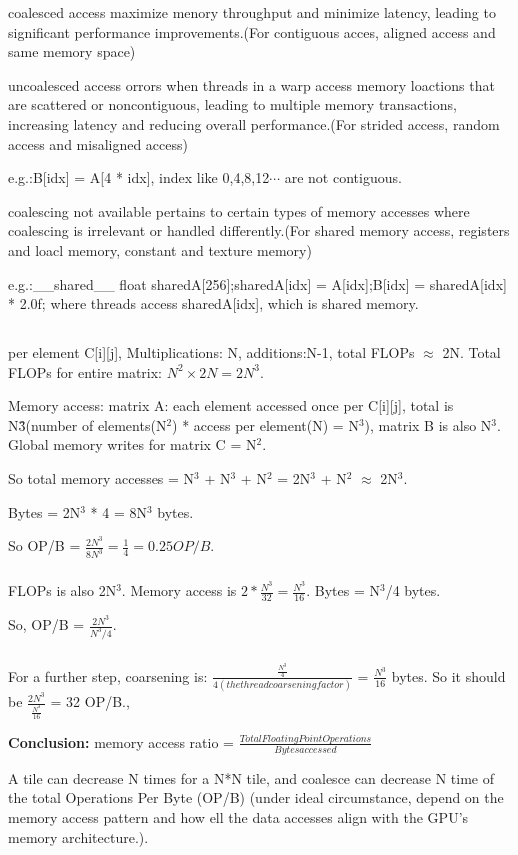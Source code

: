 \documentclass{article}
\begin{document}
coalesced access maximize menory throughput and minimize latency, leading to significant performance improvements.(For contiguous acces, aligned access and same memory space)

uncoalesced access orrors when threads in a warp access memory loactions that are scattered or noncontiguous, leading to multiple memory transactions, increasing latency and reducing overall performance.(For strided access, random access and misaligned access)

e.g.:B[idx] = A[4 * idx], index like 0,4,8,12$\cdots$ are not contiguous.

coalescing not available pertains to certain types of memory accesses where coalescing is irrelevant or handled differently.(For shared memory access, registers and loacl memory, constant and texture memory)

e.g.:\_\_shared\_\_ float sharedA[256];sharedA[idx] = A[idx];B[idx] = sharedA[idx] * 2.0f; where threads access sharedA[idx], which is shared memory.

\subsection{}
\subsubsection{}
per element C[i][j], Multiplications: N, additions:N-1, total FLOPs $\approx$ 2N. Total FLOPs for entire matrix: \(N^2 \times 2N = 2N^3\).

Memory access: matrix A: each element accessed once per C[i][j], total is N\^3(number of elements(N$^2$) * access per element(N) = N$^3$), matrix B is also N$^3$. Global memory writes for matrix C = N$^2$.

So total memory accesses = N$^3$ + N$^3$ + N$^2$ = 2N$^3$ + N$^2$ $\approx$ 2N$^3$.

Bytes = 2N$^3$ * 4 = 8N$^3$ bytes.

So OP/B = \(\frac{2N^3}{8N^3} = \frac{1}{4} = 0.25 OP/B\).

\subsubsection{}
FLOPs is also 2N$^3$. Memory access is \(2 * \frac{N^3}{32} = \frac{N^3}{16}\). Bytes = N$^3$/4 bytes.

So, OP/B = \(\frac{2N^3}{N^3/4}\).
\subsubsection{}
For a further step, coarsening is: \(\frac{\frac{N^3}{4}}{4(the thread coarsening factor)}\)  = \(\frac{N^3}{16}\) bytes.
So it should be \(\frac{2N^3}{\frac{N^3}{16}}\) = 32 OP/B.,

\textbf{Conclusion:}
memory access ratio = $\frac{Total Floating Point Operations}{Bytes accessed}$

A tile can decrease N times for a N*N tile, and coalesce can decrease N time of the total Operations Per Byte (OP/B) (under ideal circumstance, depend on the memory access pattern and how ell the data accesses align with the GPU's memory architecture.).
\end{document}

